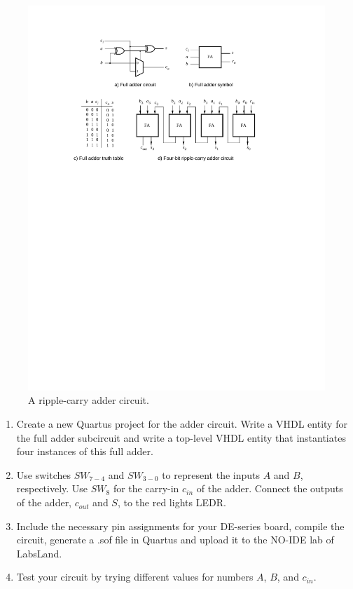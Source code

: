 \documentclass[epsfig,10pt,fullpage]{article}
\begin{document}
\begin{figure}[H]
	\begin{center}
		\includegraphics[]{figures/figure2.pdf}
	\end{center}
\caption{A ripple-carry adder circuit.}
\label{fig:fig2}
\end{figure}

\begin{enumerate}
\item Create a new Quartus project for the adder circuit. Write a VHDL entity
for the full adder subcircuit and write a top-level VHDL entity that instantiates four 
instances of this full adder.
\item Use switches $SW_{7-4}$ and $SW_{3-0}$ to represent the inputs $A$ and $B$, respectively.
Use $SW_{8}$ for the carry-in $c_{in}$ of the adder. Connect the outputs of the adder, 
$c_{out}$ and $S$, to the red lights LEDR.
\item Include the necessary pin assignments for your DE-series board, compile the circuit, generate a .sof file in Quartus and upload it to the NO-IDE lab of LabsLand.
\item Test your circuit by trying different values for numbers $A$, $B$, and $c_{in}$.
\end{enumerate}
\end{document}
